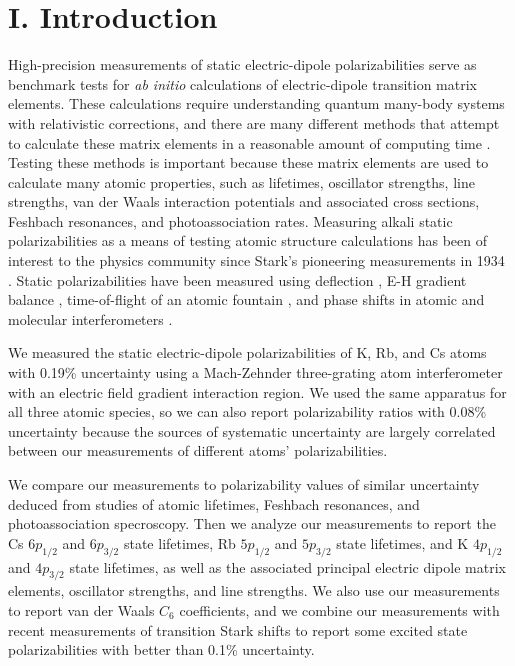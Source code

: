 \documentclass[twocolumn,prl,showpacs,superscriptaddress]{revtex4-1}   %
\begin{document}
\section{I. Introduction}

High-precision measurements of static electric-dipole polarizabilities serve as benchmark tests for \textit{ab initio} calculations of electric-dipole transition matrix elements. 
These calculations require understanding quantum many-body systems with relativistic corrections, and there are many different methods that attempt to calculate these matrix elements in a reasonable amount of computing time \cite{Mitroy2010}. Testing these methods is important because these matrix elements are used to calculate many atomic properties, such as lifetimes, oscillator strengths, line strengths, van der Waals interaction potentials and associated cross sections, Feshbach resonances, and photoassociation rates.
Measuring alkali static polarizabilities as a means of testing atomic 
structure calculations has been of interest to the physics community since
Stark's pioneering measurements in 1934 \cite{Scheffers1934}. Static polarizabilities have been measured using deflection \cite{Scheffers1934,Chamberlain1963,Hall1974,Ma2015}, E-H gradient
balance \cite{Salop1961,Molof1974a}, time-of-flight of an atomic fountain \cite{Amini2003}, and phase shifts in atomic and molecular interferometers
\cite{Ekstrom1995,Miffre2006,Holmgren2010,Berninger2007}.

We measured the static electric-dipole polarizabilities of K, Rb, and Cs atoms with 0.19\% uncertainty using a Mach-Zehnder three-grating atom interferometer \cite{Berman1997,Cronin2009} with an electric field gradient interaction region. We used the same apparatus for all three atomic species, so we can also report polarizability ratios with 0.08\% uncertainty because the sources of systematic uncertainty are largely correlated between our measurements of different atoms' polarizabilities. 

We compare our measurements to polarizability values of similar uncertainty deduced from studies of atomic lifetimes, Feshbach resonances, and photoassociation specroscopy. Then we analyze our measurements to report the Cs $6p_{1/2}$ and $6p_{3/2}$ state lifetimes, Rb $5p_{1/2}$ and $5p_{3/2}$ state lifetimes, and K $4p_{1/2}$ and $4p_{3/2}$ state lifetimes, as well as the associated principal electric dipole matrix elements, oscillator strengths, and line strengths. 
We also use our measurements to report van der Waals $C_6$ coefficients,
and we combine our measurements with recent measurements of 
transition Stark shifts to report some excited state polarizabilities with better than 0.1\% uncertainty.
\end{document}
